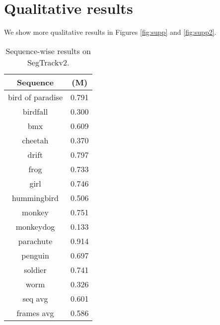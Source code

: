 \section{Qualitative results}
We show more qualitative results in Figures \ref{fig:supp} and \ref{fig:supp2}.


\begin{table}[!htb]
\centering
\footnotesize
\begin{tabular}{c|c}

Sequence&(M)\\ \hline
bird of paradise & 0.791 \\ 
birdfall & 0.300 \\ 
bmx & 0.609 \\ 
cheetah & 0.370 \\ 
drift & 0.797 \\ 
frog & 0.733 \\ 
girl & 0.746 \\ 
hummingbird & 0.506 \\ 
monkey & 0.751 \\ 
monkeydog & 0.133 \\ 
parachute & 0.914 \\ 
penguin & 0.697 \\ 
soldier & 0.741 \\ 
worm & 0.326 \\ \hline
seq avg & 0.601 \\ 
frames avg & 0.586 \\ 
\end{tabular}
\caption{Sequence-wise results on SegTrackv2.}
\label{tab:stv2}
\end{table}

